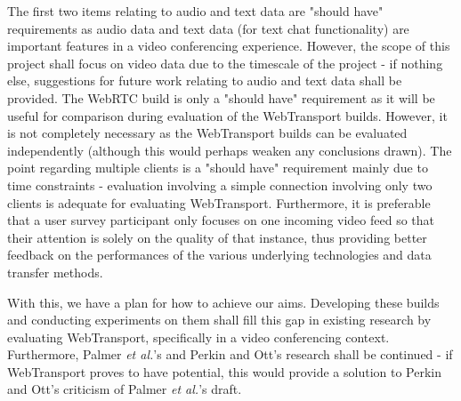 The first two items relating to audio and text data are "should have" requirements as audio data and text data (for text chat functionality) are important features in a video conferencing experience. However, the scope of this project shall focus on video data due to the timescale of the project - if nothing else, suggestions for future work relating to audio and text data shall be provided.
The WebRTC build is only a "should have" requirement as it will be useful for comparison during evaluation of the WebTransport builds. However, it is not completely necessary as the WebTransport builds can be evaluated independently (although this would perhaps weaken any conclusions drawn).  
The point regarding multiple clients is a "should have" requirement mainly due to time constraints - evaluation involving a simple connection involving only two clients is adequate for evaluating WebTransport. Furthermore, it is preferable that a user survey participant only focuses on one incoming video feed so that their attention is solely on the quality of that instance, thus providing better feedback on the performances of the various underlying technologies and data transfer methods. 

\hfill

With this, we have a plan for how to achieve our aims. Developing these builds and conducting experiments on them shall fill this gap in existing research by evaluating WebTransport, specifically in a video conferencing context. Furthermore, Palmer \textit{et al.}'s \cite{palmer2018} and Perkin and Ott's \cite{perkins2018} research shall be continued - if WebTransport proves to have potential, this would provide a solution to Perkin and Ott's criticism of Palmer \textit{et al.}'s draft.  




